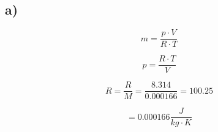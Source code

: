 

\subsection*{a)}
\[
m = \frac{p \cdot V}{R \cdot T}
\]

\[
p = \frac{R \cdot T}{V}
\]

\[
R = \frac{R}{M} = \frac{8.314}{0.000166} = 100.25
\]

\[
= 0.000166 \frac{J}{kg \cdot K}
\]